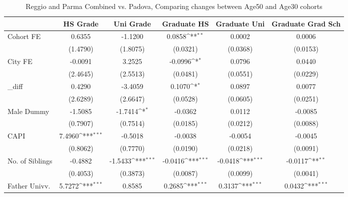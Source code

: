 \begin{table}[htbp]\centering
\def\sym#1{\ifmmode^{#1}\else\(^{#1}\)\fi}
\caption{Reggio and Parma Combined vs. Padova, Comparing changes between Age50 and Age30 cohorts}
\begin{tabular}{l*{5}{c}}
\toprule
            &\multicolumn{1}{c}{HS Grade}&\multicolumn{1}{c}{Uni Grade}&\multicolumn{1}{c}{Graduate HS}&\multicolumn{1}{c}{Graduate Uni}&\multicolumn{1}{c}{Graduate Grad Sch}\\
\midrule
Cohort FE   &      0.6355         &     -1.1200         &      0.0858\sym{**} &      0.0002         &      0.0006         \\
            &    (1.4790)         &    (1.8075)         &    (0.0321)         &    (0.0368)         &    (0.0153)         \\
\addlinespace
City FE     &     -0.0091         &      3.2525         &     -0.0996\sym{*}  &      0.0796         &      0.0440         \\
            &    (2.4645)         &    (2.5513)         &    (0.0481)         &    (0.0551)         &    (0.0229)         \\
\addlinespace
\_diff       &      0.4290         &     -3.4059         &      0.1070\sym{*}  &      0.0897         &      0.0077         \\
            &    (2.6289)         &    (2.6647)         &    (0.0528)         &    (0.0605)         &    (0.0251)         \\
\addlinespace
Male Dummy  &     -1.5085         &     -1.7414\sym{*}  &     -0.0362         &      0.0112         &     -0.0085         \\
            &    (0.7907)         &    (0.7514)         &    (0.0185)         &    (0.0212)         &    (0.0088)         \\
\addlinespace
CAPI        &      7.4960\sym{***}&     -0.5018         &     -0.0038         &     -0.0054         &     -0.0045         \\
            &    (0.8062)         &    (0.7770)         &    (0.0190)         &    (0.0218)         &    (0.0091)         \\
\addlinespace
No. of Siblings&     -0.4882         &     -1.5433\sym{***}&     -0.0416\sym{***}&     -0.0418\sym{***}&     -0.0117\sym{**} \\
            &    (0.4053)         &    (0.3873)         &    (0.0087)         &    (0.0099)         &    (0.0041)         \\
\addlinespace
Father Univv.&      5.7272\sym{***}&      0.8585         &      0.2685\sym{***}&      0.3137\sym{***}&      0.0432\sym{***}\\

\end{tabular}
\end{table}
